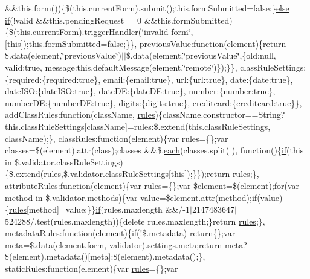 \begin{DoxyCompactItemize}
\&\&this.\+form())\{\$(this.\+current\+Form).submit();this.\+form\+Submitted=false;\}\hyperlink{_scripts_2jquery_8validate_8js_a0544c3fe466e421738dae463968b70ba}{else} \hyperlink{_scripts_2respond_8min_8js_a93851d60dd037a83509a1757b9ee7b66}{if}(!valid \&\&this.\+pending\+Request==0 \&\&this.\+form\+Submitted)\{\$(this.\+current\+Form).trigger\+Handler(\char`\"{}invalid-\/form\char`\"{}, \mbox{[}this\mbox{]});this.\+form\+Submitted=false;\}\}, previous\+Value\+:function(element)\{return \$.data(element,\char`\"{}previous\+Value\char`\"{})$\vert$$\vert$\$.data(element,\char`\"{}previous\+Value\char`\"{},\{old\+:null, valid\+:true, message\+:this.\+default\+Message(element,\char`\"{}remote\char`\"{})\});\}\}, class\+Rule\+Settings\+:\{required\+:\{required\+:true\}, email\+:\{email\+:true\}, url\+:\{url\+:true\}, date\+:\{date\+:true\}, date\+I\+S\+O\+:\{date\+I\+S\+O\+:true\}, date\+D\+E\+:\{date\+D\+E\+:true\}, number\+:\{number\+:true\}, number\+D\+E\+:\{number\+D\+E\+:true\}, digits\+:\{digits\+:true\}, creditcard\+:\{creditcard\+:true\}\}, add\+Class\+Rules\+:function(class\+Name, \hyperlink{_scripts_2respond_8js_ada87c2e257bc5ff6e77cdbc23ed986a3}{rules})\{class\+Name.\+constructor==String?this.\+class\+Rule\+Settings\mbox{[}class\+Name\mbox{]}=rules\+:\$.\+extend(this.\+class\+Rule\+Settings, class\+Name);\}, class\+Rules\+:function(element)\{var \hyperlink{_scripts_2respond_8js_ada87c2e257bc5ff6e77cdbc23ed986a3}{rules}=\{\};var classes=\$(element).attr(\textquotesingle{}class\textquotesingle{});classes \&\&\$.\hyperlink{_scripts_2jquery-1_810_82_8min_8js_af24c9ea1e34372f8c8b312b35586008d}{each}(classes.\+split(\textquotesingle{} \textquotesingle{}), function()\{\hyperlink{_scripts_2respond_8min_8js_a93851d60dd037a83509a1757b9ee7b66}{if}(this in \$.validator.\+class\+Rule\+Settings)\{\$.extend(\hyperlink{_scripts_2respond_8js_ada87c2e257bc5ff6e77cdbc23ed986a3}{rules},\$.validator.\+class\+Rule\+Settings\mbox{[}this\mbox{]});\}\});return \hyperlink{_scripts_2respond_8js_ada87c2e257bc5ff6e77cdbc23ed986a3}{rules};\}, attribute\+Rules\+:function(element)\{var \hyperlink{_scripts_2respond_8js_ada87c2e257bc5ff6e77cdbc23ed986a3}{rules}=\{\};var \$element=\$(element);for(var method in \$.validator.\+methods)\{var value=\$element.\+attr(method);\hyperlink{_scripts_2respond_8min_8js_a93851d60dd037a83509a1757b9ee7b66}{if}(value)\{\hyperlink{_scripts_2respond_8js_ada87c2e257bc5ff6e77cdbc23ed986a3}{rules}\mbox{[}method\mbox{]}=value;\}\}\hyperlink{_scripts_2respond_8min_8js_a93851d60dd037a83509a1757b9ee7b66}{if}(rules.\+maxlength \&\&/-\/1$\vert$2147483647$\vert$524288/.test(rules.\+maxlength))\{delete rules.\+maxlength;\}return \hyperlink{_scripts_2respond_8js_ada87c2e257bc5ff6e77cdbc23ed986a3}{rules};\}, metadata\+Rules\+:function(element)\{\hyperlink{_scripts_2respond_8min_8js_a93851d60dd037a83509a1757b9ee7b66}{if}(!\$.metadata) return\{\};var meta=\$.data(element.\+form, \textquotesingle{}\hyperlink{_scripts_2jquery_8validate_8js_a2dc8272bb221cdffcccbd20db038f172}{validator}\textquotesingle{}).settings.\+meta;return meta?\$(element).metadata()\mbox{[}meta\mbox{]}\+:\$(element).metadata();\}, static\+Rules\+:function(element)\{var \hyperlink{_scripts_2respond_8js_ada87c2e257bc5ff6e77cdbc23ed986a3}{rules}=\{\};var 
\end{DoxyCompactItemize}
